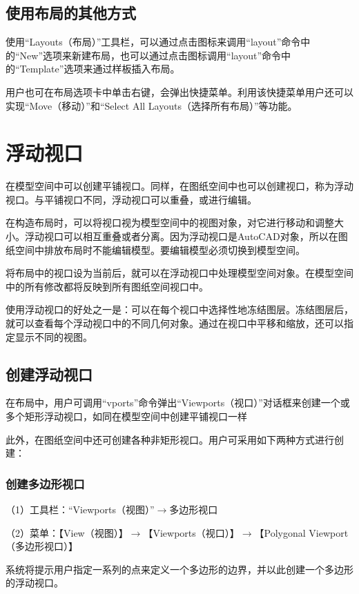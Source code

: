 \section{使用布局的其他方式}

使用“Layouts（布局）”工具栏，可以通过点击图标来调用“layout”命令中的“New”选项来新建布局，也可以通过点击图标调用“layout”命令中的“Template”选项来通过样板插入布局。

用户也可在布局选项卡中单击右键，会弹出快捷菜单。利用该快捷菜单用户还可以实现“Move（移动）”和“Select All Layouts（选择所有布局）”等功能。

\chapter{浮动视口}

在模型空间中可以创建平铺视口。同样，在图纸空间中也可以创建视口，称为浮动视口。与平铺视口不同，浮动视口可以重叠，或进行编辑。

在构造布局时，可以将视口视为模型空间中的视图对象，对它进行移动和调整大小。浮动视口可以相互重叠或者分离。因为浮动视口是AutoCAD对象，所以在图纸空间中排放布局时不能编辑模型。要编辑模型必须切换到模型空间。

将布局中的视口设为当前后，就可以在浮动视口中处理模型空间对象。在模型空间中的所有修改都将反映到所有图纸空间视口中。

使用浮动视口的好处之一是：可以在每个视口中选择性地冻结图层。冻结图层后，就可以查看每个浮动视口中的不同几何对象。通过在视口中平移和缩放，还可以指定显示不同的视图。

\section{创建浮动视口}

在布局中，用户可调用“vports”命令弹出“Viewports（视口）”对话框来创建一个或多个矩形浮动视口，如同在模型空间中创建平铺视口一样


此外，在图纸空间中还可创建各种非矩形视口。用户可采用如下两种方式进行创建：

\subsection{创建多边形视口}

（1）工具栏：“Viewports（视图）”$\to$多边形视口

（2）菜单：【View（视图）】$\to$【Viewports（视口）】$\to$【Polygonal Viewport（多边形视口）】

系统将提示用户指定一系列的点来定义一个多边形的边界，并以此创建一个多边形的浮动视口。


